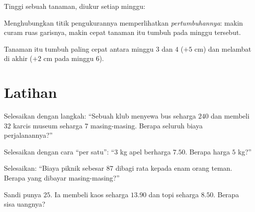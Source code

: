 \begin{example}\label{ex:g5:data:line}
Tinggi sebuah tanaman, diukur setiap minggu:

\begin{omfigure}

{\small Menghubungkan titik pengukurannya memperlihatkan
\emph{pertumbuhannya}: makin curam ruas garisnya, makin cepat tanaman itu tumbuh pada minggu tersebut.}
\end{omfigure}

Tanaman itu tumbuh paling cepat antara minggu $3$ dan $4$ ($+5$ cm)
dan melambat di akhir ($+2$ cm pada minggu $6$).
\end{example}

\section{Latihan}

\begin{exercise}[$\star$]\label{exo:g5:data:1}
Selesaikan dengan langkah: ``Sebuah klub menyewa bus seharga $240$
dan membeli $32$ karcis museum seharga $7$ masing-masing. Berapa seluruh biaya perjalanannya?''
\end{exercise}

\begin{exercise}[$\star$]\label{exo:g5:data:2}
Selesaikan dengan cara ``per satu'': ``$3$ kg apel berharga $7.50$.
Berapa harga $5$ kg?''
\end{exercise}

\begin{exercise}[$\star$]\label{exo:g5:data:3}
Selesaikan: ``Biaya piknik sebesar $87$ dibagi rata kepada enam
orang teman. Berapa yang dibayar masing-masing?''
\end{exercise}

\begin{exercise}[$\star$]\label{exo:g5:data:4}
Sandi punya $25$. Ia membeli kaos seharga $13.90$ dan topi seharga
$8.50$. Berapa sisa uangnya?
\end{exercise}

